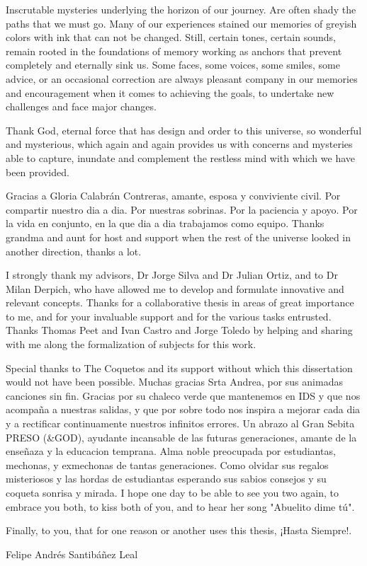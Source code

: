 Inscrutable mysteries underlying the horizon of our journey. Are often shady the paths that we must go. Many of our experiences stained our memories of greyish colors with ink that can not be changed. Still, certain tones, certain sounds, remain rooted in the foundations of memory working as anchors that prevent completely and eternally sink us. Some faces, some voices, some smiles, some advice, or an occasional correction are always pleasant company in our memories and encouragement when it comes to achieving the goals, to undertake new challenges and face major changes. 

Thank God, eternal force that has design and order to this universe, so wonderful and mysterious, which again and again provides us with concerns and mysteries able to capture, inundate and complement the restless mind with which we have been provided.

Gracias a Gloria Calabrán Contreras, amante, esposa y conviviente civil. Por compartir nuestro dia a dia. Por nuestras sobrinas. Por la paciencia y apoyo. Por la vida en conjunto, en la que dia a dia trabajamos como equipo.
Thanks grandma and aunt for host and support when the rest of the universe looked in another direction, thanks a lot.

\small{
I strongly thank my advisors, Dr Jorge Silva and Dr Julian Ortiz, and to Dr Milan Derpich, who have allowed me to develop and formulate innovative and relevant concepts. Thanks for a collaborative thesis in areas of great importance to me, and for your invaluable support and for the various tasks entrusted. Thanks Thomas Peet and Ivan Castro and Jorge Toledo by helping and sharing with me along the formalization of subjects for this work.
}

Special thanks to The Coquetos and its support without which this dissertation would not have been possible. Muchas gracias Srta Andrea, por sus animadas canciones sin fin. Gracias por su chaleco verde que mantenemos en IDS y que nos acompaña a nuestras salidas, y que por sobre todo nos inspira a mejorar cada dia y a rectificar continuamente nuestros infinitos errores. Un abrazo al Gran Sebita PRESO (\&GOD), ayudante incansable de las futuras generaciones, amante de la enseñaza y la educacion temprana. Alma noble preocupada por estudiantas, mechonas, y exmechonas de tantas generaciones. Como olvidar sus regalos misteriosos y las hordas de estudiantas esperando sus sabios consejos y su coqueta sonrisa y mirada. I hope one day to be able to see you two again, to embrace you both, to kiss both of you, and to hear her song "Abuelito dime tú".

\small{
Finally, to you, that for one reason or another uses this thesis,  ¡Hasta Siempre!. 
\begin{flushright}
Felipe Andr\'es Santib\'añez Leal
\end{flushright}
}